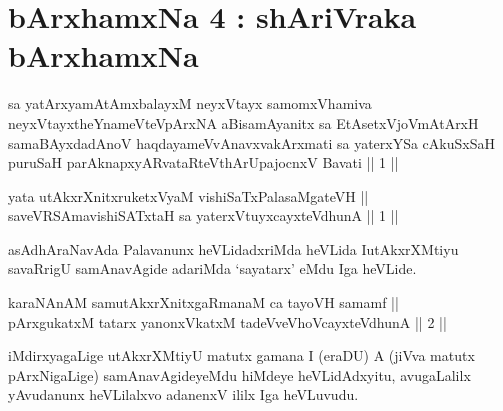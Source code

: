 

\chapter{bArxhamxNa 4 : shAriVraka bArxhamxNa}


\begin{kandikeshl}
sa yatArxyamAtAmxbalayxM neyxVtayx samomxVhamiva neyxVtayxtheYnameVteV\break pArxNA aBisamAyanitx sa EtAsetxVjoVmAtArxH samaBAyxdadAnoV haqdaya\-\break meVvAnavxvakArxmati sa yaterxYSa cAkuSxSaH puruSaH parAknapxyARvataR\-\break teV\s thArUpajocnxV Bavati || 1 ||
\end{kandikeshl}



\begin{shl}
yata utAkxrXnitxruketxVyaM vishiSaTxPalasaMgateVH || \\
saveVRSAmavishiSATx\s taH sa yaterxVtuyxcayxteV\s dhunA \hfill || 1 ||
\end{shl}

\begin{artha}
asAdhAraNavAda Palavanunx heVLidadxriMda heVLida I\break utAkxrXMtiyu
savaRrigU samAnavAgide adariMda `sayatarx' eMdu Iga heVLide.
\end{artha}


\begin{shl}
karaNAnAM samutAkxrXnitxgaRmanaM ca tayoVH samamf || \\
pArxgukatxM tatarx yanonxVkatxM tadeVveVhoVcayxteV\s dhunA \hfill || 2 ||
\end{shl}

\begin{artha}
iMdirxyagaLige utAkxrXMtiyU matutx gamana I (eraDU) A (jiVva matutx
pArxNigaLige) samAnavAgideyeMdu hiMdeye heVLidAdxyitu, avugaLalilx
yAvudanunx heVLilalxvo adanenxV ililx Iga heVLuvudu.
\end{artha}

